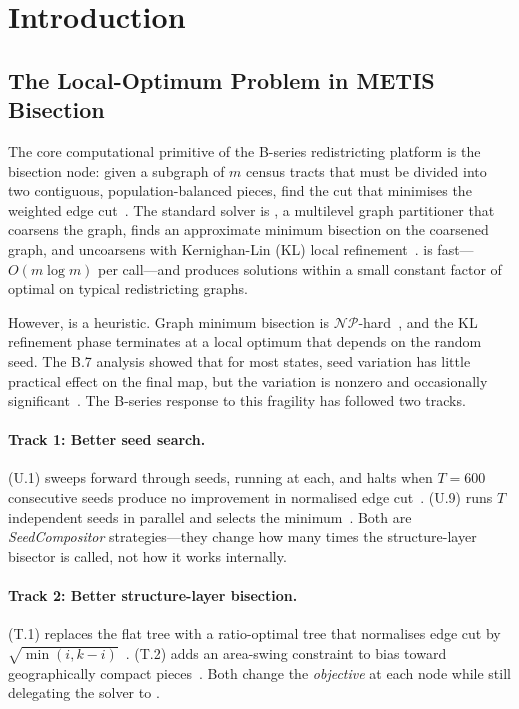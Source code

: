 \section{Introduction}
\label{sec:introduction}

\subsection{The Local-Optimum Problem in METIS Bisection}

The core computational primitive of the B-series redistricting platform is
the bisection node: given a subgraph of $m$ census tracts that must be
divided into two contiguous, population-balanced pieces, find the cut that
minimises the weighted edge cut~\citep{b8paper, b11paper}.
The standard solver is \metis{}, a multilevel graph partitioner that
coarsens the graph, finds an approximate minimum bisection on the coarsened
graph, and uncoarsens with Kernighan-Lin (KL) local refinement~\citep{karypis1998}.
\metis{} is fast---$O(m \log m)$ per call---and produces solutions within a
small constant factor of optimal on typical redistricting graphs.

However, \metis{} is a heuristic.
Graph minimum bisection is $\mathcal{NP}$-hard~\citep{garey1976}, and the KL
refinement phase terminates at a local optimum that depends on the random
seed.
The B.7 analysis showed that for most states, seed variation has little
practical effect on the final map, but the variation is nonzero and
occasionally significant~\citep{b7paper}.
The B-series response to this fragility has followed two tracks.

\paragraph{Track 1: Better seed search.}
\cs{} (U.1) sweeps forward through seeds, running \metis{} at each, and
halts when $T=600$ consecutive seeds produce no improvement in normalised
edge cut~\citep{b16paper}.
\be{} (U.9) runs $T$ independent \metis{} seeds in parallel and selects
the minimum~\citep{h1paper}.
Both are \emph{SeedCompositor} strategies---they change how many times the
structure-layer bisector is called, not how it works internally.

\paragraph{Track 2: Better structure-layer bisection.}
\geosec{} (T.1) replaces the flat tree with a ratio-optimal tree that
normalises edge cut by $\sqrt{\min(i,k-i)}$~\citep{b8paper}.
\areasec{} (T.2) adds an area-swing constraint to bias toward
geographically compact pieces~\citep{b9paper}.
Both change the \emph{objective} at each node while still delegating
the solver to \metis{}.

